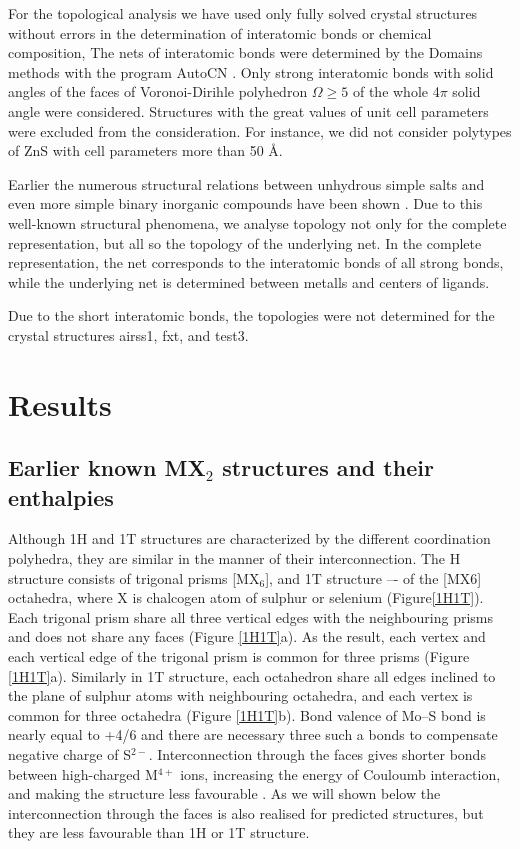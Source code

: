 \documentclass[a4paperm]{article}
\begin{document}
For the topological analysis we have used only fully solved crystal structures without errors in the determination of interatomic bonds or chemical composition,
The nets of interatomic bonds were determined by the Domains methods with the program AutoCN \cite{blatov2016_rods}. 
Only strong interatomic bonds  with solid angles of the faces of Voronoi-Dirihle polyhedron $\Omega \geq 5 $ of the whole 4$\pi$ solid angle were considered.
Structures with the great values of unit cell parameters were excluded from the consideration.
For instance, we did not consider polytypes of ZnS with cell parameters more than 50 \AA.

Earlier the numerous structural relations between unhydrous simple salts and even more simple binary inorganic compounds have been shown \cite{blatov2011_salts, medrish2020_zintl}. 
Due to this well-known structural phenomena, we analyse topology not only for the complete  representation, but all so the topology of the underlying net.
In the complete representation, the net corresponds to the interatomic bonds of all strong bonds, while the underlying net is determined between metalls and centers of ligands.

Due to the short interatomic bonds, the topologies were not determined for the crystal structures airss1, fxt, and  test3.


			\section{Results}

\subsection*{Earlier known MX$_2$ structures and their enthalpies}

Although 1H and 1T structures are characterized by the different coordination polyhedra, they are similar in the manner of their interconnection.
The H structure consists of trigonal prisms [MX$_6$], and 1T structure –- of the [MX6] octahedra, where X is chalcogen atom of sulphur or selenium (Figure\ref{1H1T}).
Each trigonal prism share all three vertical edges with the neighbouring prisms and does not share any faces (Figure \ref{1H1T}a).
As the result, each vertex and each vertical edge of the trigonal prism is common for three prisms (Figure \ref{1H1T}a).
Similarly in 1T structure, each octahedron share all edges inclined to the plane of sulphur atoms with neighbouring octahedra, and each vertex is common for three octahedra (Figure \ref{1H1T}b).
Bond valence of Mo--S bond is nearly equal to +4/6 and there are necessary three such a bonds to compensate negative charge of S$^{2-}$.
Interconnection through the faces gives shorter bonds between high-charged M$^{4+}$ ions, increasing the energy of Couloumb interaction, and making the structure less favourable \cite{pauling1929}.
As we will shown below the interconnection through the faces is also realised for predicted structures, but they are less favourable than 1H or 1T structure.
\end{document}
